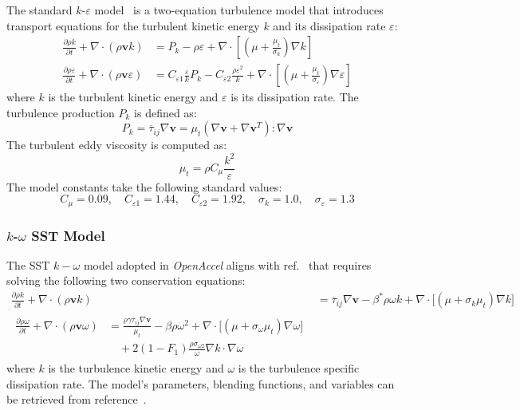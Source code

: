 \documentclass[12pt]{extarticle}
\newcommand{\<}{\langle}
\renewcommand{\>}{\rangle}
\theoremstyle{definition}
\begin{document}
The standard $k$-$\varepsilon$ model~\cite{launder1974numerical} is a two-equation turbulence model that introduces transport equations for the turbulent kinetic energy $k$ and its dissipation rate $\varepsilon$:
\begin{align}
\frac{\partial \rho k}{\partial t} + \nabla\cdot(\rho \textbf{v} k) &= P_k - \rho\varepsilon + \nabla\cdot\left[\left(\mu+\frac{\mu_t}{\sigma_k}\right) \nabla k\right] \\
\frac{\partial \rho \varepsilon}{\partial t} + \nabla\cdot(\rho \textbf{v} \varepsilon) &= C_{\varepsilon 1}\frac{\varepsilon}{k}P_k - C_{\varepsilon 2}\frac{\rho\varepsilon^2}{k} + \nabla\cdot\left[\left(\mu+\frac{\mu_t}{\sigma_\varepsilon}\right) \nabla \varepsilon\right]
\end{align}
where $k$ is the turbulent kinetic energy and $\varepsilon$ is its dissipation rate. The turbulence production $P_k$ is defined as:
\begin{equation}
    P_k = \overline{\tau}_{ij} \nabla \textbf{v} = \mu_t \left(\nabla\textbf{v}+\nabla\textbf{v}^T\right):\nabla\textbf{v}
\end{equation}
The turbulent eddy viscosity is computed as:
\begin{equation}
    \mu_t = \rho C_\mu \frac{k^2}{\varepsilon}
\end{equation}
The model constants take the following standard values:
\begin{equation}
    C_\mu = 0.09,\quad C_{\varepsilon 1} = 1.44,\quad C_{\varepsilon 2} = 1.92,\quad \sigma_k = 1.0,\quad \sigma_\varepsilon = 1.3
\end{equation}

\subsubsection{$k$-$\omega$ SST Model}

The SST $k-\omega$ model adopted in \textit{OpenAccel} aligns with ref.~\cite{menter1994two} that requires solving the following two conservation equations:
\begin{align}
\frac{\partial \rho k}{\partial t} + \nabla\cdot(\rho \textbf{v} k) &= \overline{\tau}_{ij} \nabla \textbf{v} - \beta^*\rho\omega k + \nabla\cdot\big[(\mu+\sigma_k\mu_t) \nabla k\big]\\
\begin{split}
\frac{\partial \rho \omega}{\partial t} + \nabla\cdot(\rho \textbf{v} \omega) &= \frac{\rho \gamma \overline{\tau}_{ij} \nabla \textbf{v}}{\mu_t} - \beta\rho\omega^2 + \nabla\cdot\big[(\mu+\sigma_{\omega}\mu_t) \nabla \omega\big]\\
&\quad + 2(1-F_1)\frac{\rho\sigma_{\omega 2}}{\omega} \nabla k \cdot \nabla \omega
\end{split}
\end{align}
where $k$ is the turbulence kinetic energy and $\omega$ is the turbulence specific dissipation rate. The model's parameters, blending functions, and variables can be retrieved from reference~\cite{menter1994two}.
\end{document}
